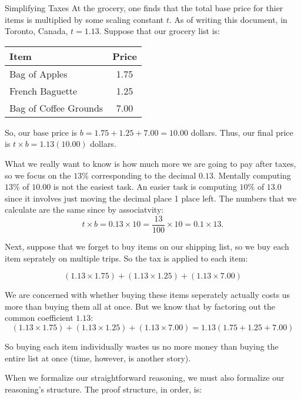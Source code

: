 \documentclass[../proofs.tex]{subfiles}
\begin{document}
 \begin{expl}{ Simplifying Taxes }
   At the grocery, one finds that the total base price for
   thier items is multiplied by some scaling constant $t$.
   As of writing this document, in Toronto, Canada, $t = 1.13$.
   Suppose that our grocery list is:
  \begin{center}
    \begin{tabular}{|l|c|}
    \hline 
    Item                   & Price \\ 
    \hline 
    Bag of Apples          & 1.75 \\ 
    French Baguette        & 1.25 \\ 
    Bag of Coffee Grounds  & 7.00 \\ 
    \hline 
    \end{tabular} 
  \end{center}

  So, our base price is $b = 1.75 + 1.25 + 7.00 = 10.00$ dollars.
  Thus, our final price is $t \times b = 1.13 (10.00)$ dollars.

  What we really want to know is how much more we are going to pay after
  taxes, so we focus on the $13\%$ corresponding to the decimal $0.13$.
  Mentally computing $13\%$ of $10.00$ is not the easiest task. An 
  easier task is computing $10\%$ of $13.0$ since it involves just moving
  the decimal place 1 place left.
  The numbers that we calculate are the same since by associatvity: 
  $$ t \times b = 0.13 \times 10 = \frac{13}{100} \times 10 = 0.1 \times 13.$$
  

  Next, suppose that we forget to buy items on our shipping list,
  so we buy each item seprately on multiple trips. So the tax is
  applied to each item:

  $$(1.13 \times 1.75) + (1.13 \times 1.25) + (1.13 \times 7.00)$$

  We are concerned with whether buying these items seperately actually
  costs us more than buying them all at once. But we know that by
  factoring out the common coefficient $1.13$:
  $$ (1.13 \times 1.75) + (1.13 \times 1.25) + (1.13 \times 7.00)
  = 1.13 (1.75 + 1.25 + 7.00) $$

  So buying each item individually wastes us no more money than buying the entire
  list at once (time, however, is another story). 
 \end{expl}



 When we formalize our straightforward reasoning, we must also
 formalize our reasoning's structure. The proof structure, in order, is:
\end{document}
